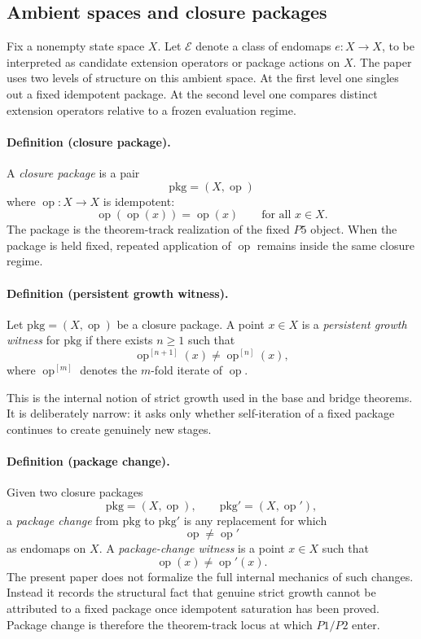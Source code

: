 \documentclass[11pt]{article}
\begin{document}
\subsection*{Ambient spaces and closure packages}

Fix a nonempty state space $X$. Let $\mathcal{E}$ denote a class of endomaps $e \colon X \to X$, to be interpreted as candidate extension operators or package actions on $X$. The paper uses two levels of structure on this ambient space. At the first level one singles out a fixed idempotent package. At the second level one compares distinct extension operators relative to a frozen evaluation regime.

\paragraph{Definition (closure package).}
A \emph{closure package} is a pair
\[
\mathrm{pkg}=(X,\operatorname{op})
\]
where $\operatorname{op}\colon X\to X$ is idempotent:
\[
\operatorname{op}(\operatorname{op}(x))=\operatorname{op}(x)\qquad \text{for all }x\in X.
\]
The package is the theorem-track realization of the fixed \(P5\) object. When the package is held fixed, repeated application of $\operatorname{op}$ remains inside the same closure regime.

\paragraph{Definition (persistent growth witness).}
Let $\mathrm{pkg}=(X,\operatorname{op})$ be a closure package. A point $x\in X$ is a \emph{persistent growth witness} for $\mathrm{pkg}$ if there exists $n\ge 1$ such that
\[
\operatorname{op}^{[n+1]}(x)\neq \operatorname{op}^{[n]}(x),
\]
where $\operatorname{op}^{[m]}$ denotes the $m$-fold iterate of $\operatorname{op}$.

This is the internal notion of strict growth used in the base and bridge theorems. It is deliberately narrow: it asks only whether self-iteration of a fixed package continues to create genuinely new stages.

\paragraph{Definition (package change).}
Given two closure packages
\[
\mathrm{pkg}=(X,\operatorname{op}), \qquad \mathrm{pkg}'=(X,\operatorname{op}'),
\]
a \emph{package change} from $\mathrm{pkg}$ to $\mathrm{pkg}'$ is any replacement for which
\[
\operatorname{op}\neq \operatorname{op}'
\]
as endomaps on $X$. A \emph{package-change witness} is a point $x\in X$ such that
\[
\operatorname{op}(x)\neq \operatorname{op}'(x).
\]
The present paper does not formalize the full internal mechanics of such changes. Instead it records the structural fact that genuine strict growth cannot be attributed to a fixed package once idempotent saturation has been proved. Package change is therefore the theorem-track locus at which \(P1/P2\) enter.
\end{document}
